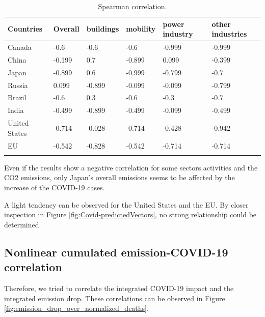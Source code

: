 \begin{center}
\begin{table}[h!]
	\centering
	\begin{tabular}{llllll}
		\hline
		 Countries&Overall&buildings&mobility&power industry&other industries\\
		\hline
		\hline
		 Canada   & -0.6 & -0.6& -0.6& -0.999& -0.999\\
  		 China &  -0.199 & 0.7& -0.899& 0.099& -0.399\\
 		 Japan & -0.899 & 0.6& -0.999& -0.799& -0.7\\
 		 Russia &0.099 & -0.899& -0.099& -0.099& -0.799\\
  		 Brazil & -0.6 & 0.3& -0.6& -0.3& -0.7\\
		 India & -0.499& -0.899& -0.499& -0.099& -0.499\\
 		 United States & -0.714 & -0.028& -0.714& -0.428& -0.942\\
		 EU &-0.542 & -0.828& -0.542& -0.714& -0.714\\
		\hline &\\
	\end{tabular}
	\caption{Spearman correlation.}%
	\label{tab:spearman}	
\end{table}	
\end{center}

Even if the results show a negative correlation for some sectors activities and the CO2 emissions, only Japan's overall emissions seems to be affected by the increase of the COVID-19 cases.

A light tendency can be observed for the United States and the EU. By closer inspection in Figure \ref{fig:Covid-predictedVectors}, no strong relationship could be determined.

\subsection*{Nonlinear cumulated emission-COVID-19 correlation}

Therefore, we tried to correlate the integrated COVID-19 impact and the integrated emission drop. These correlations can be observed in Figure \ref{fig:emission_drop_over_normalized_deaths}. 

